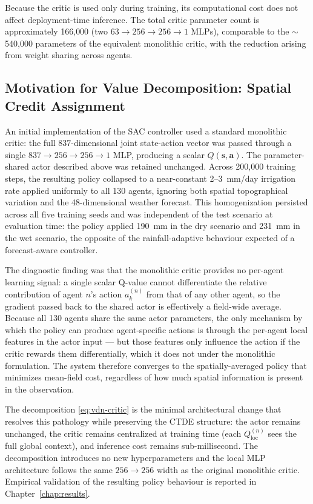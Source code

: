 Because the critic is used only during training, its computational cost
does not affect deployment-time inference. The total critic parameter count
is approximately 166{,}000 (two $63 \to 256 \to 256 \to 1$ MLPs), comparable
to the $\sim$540{,}000 parameters of the equivalent monolithic critic, with
the reduction arising from weight sharing across agents.

\subsection{Motivation for Value Decomposition: Spatial Credit Assignment}
\label{ssec:ctrl-sac-critic-motivation}

An initial implementation of the SAC controller used a standard monolithic
critic: the full $837$-dimensional joint state-action vector was passed
through a single $837 \to 256 \to 256 \to 1$ MLP, producing a scalar
$Q(\mathbf{s}, \mathbf{a})$. The parameter-shared actor described above was
retained unchanged. Across 200{,}000 training steps, the resulting policy
collapsed to a near-constant 2–3~mm/day irrigation rate applied uniformly to
all 130 agents, ignoring both spatial topographical variation and the
48-dimensional weather forecast. This homogenization persisted across all
five training seeds and was independent of the test scenario at evaluation
time: the policy applied 190~mm in the dry scenario and 231~mm in the wet
scenario, the opposite of the rainfall-adaptive behaviour expected of a
forecast-aware controller.

The diagnostic finding was that the monolithic critic provides no per-agent
learning signal: a single scalar Q-value cannot differentiate the relative
contribution of agent $n$'s action $a_k^{(n)}$ from that of any other agent,
so the gradient passed back to the shared actor is effectively a field-wide
average. Because all 130 agents share the same actor parameters, the only
mechanism by which the policy can produce agent-specific actions is through
the per-agent local features in the actor input — but those features only
influence the action if the critic rewards them differentially, which it does
not under the monolithic formulation. The system therefore converges to the
spatially-averaged policy that minimizes mean-field cost, regardless of how
much spatial information is present in the observation.

The decomposition \eqref{eq:vdn-critic} is the minimal architectural change
that resolves this pathology while preserving the CTDE structure: the actor
remains unchanged, the critic remains centralized at training time (each
$Q_{\mathrm{loc}}^{(n)}$ sees the full global context), and inference cost
remains sub-millisecond. The decomposition introduces no new hyperparameters
and the local MLP architecture follows the same $256 \to 256$ width as the
original monolithic critic. Empirical validation of the resulting policy
behaviour is reported in Chapter~\ref{chap:results}.

